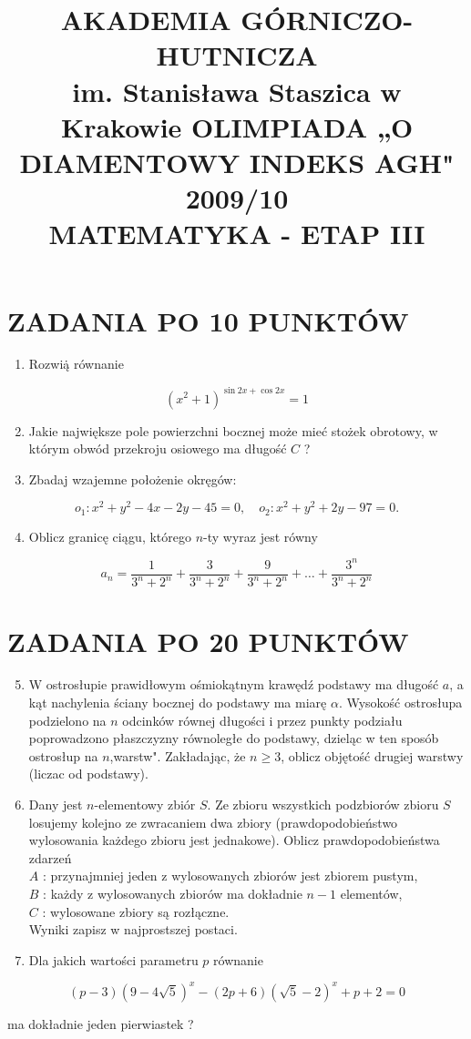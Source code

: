 \documentclass[10pt]{article}
\title{AKADEMIA GÓRNICZO-HUTNICZA \\
 im. Stanisława Staszica w Krakowie OLIMPIADA „O DIAMENTOWY INDEKS AGH" 2009/10 \\
 MATEMATYKA - ETAP III }
\author{}
\date{}
\begin{document}
\maketitle
\section*{ZADANIA PO 10 PUNKTÓW}
\begin{enumerate}
  \item Rozwią̇ równanie
\end{enumerate}

$$
\left(x^{2}+1\right)^{\sin 2 x+\cos 2 x}=1
$$

\begin{enumerate}
  \setcounter{enumi}{1}
  \item Jakie największe pole powierzchni bocznej może mieć stożek obrotowy, w którym obwód przekroju osiowego ma długość $C$ ?
  \item Zbadaj wzajemne położenie okręgów:
\end{enumerate}

$$
o_{1}: x^{2}+y^{2}-4 x-2 y-45=0, \quad o_{2}: x^{2}+y^{2}+2 y-97=0 .
$$

\begin{enumerate}
  \setcounter{enumi}{3}
  \item Oblicz granicę ciągu, którego $n$-ty wyraz jest równy
\end{enumerate}

$$
a_{n}=\frac{1}{3^{n}+2^{n}}+\frac{3}{3^{n}+2^{n}}+\frac{9}{3^{n}+2^{n}}+\ldots+\frac{3^{n}}{3^{n}+2^{n}}
$$

\section*{ZADANIA PO 20 PUNKTÓW}
\begin{enumerate}
  \setcounter{enumi}{4}
  \item W ostrosłupie prawidłowym ośmiokątnym krawędź podstawy ma długość $a$, a kąt nachylenia ściany bocznej do podstawy ma miarę $\alpha$. Wysokość ostrosłupa podzielono na $n$ odcinków równej długości i przez punkty podziału poprowadzono płaszczyzny równoległe do podstawy, dzieląc w ten sposób ostrosłup na $n$,warstw". Zakładając, że $n \geq 3$, oblicz objętość drugiej warstwy (liczac od podstawy).
  \item Dany jest $n$-elementowy zbiór $S$. Ze zbioru wszystkich podzbiorów zbioru $S$ losujemy kolejno ze zwracaniem dwa zbiory (prawdopodobieństwo wylosowania każdego zbioru jest jednakowe). Oblicz prawdopodobieństwa zdarzeń\\
$A$ : przynajmniej jeden z wylosowanych zbiorów jest zbiorem pustym,\\
$B$ : każdy z wylosowanych zbiorów ma dokładnie $n-1$ elementów,\\
$C$ : wylosowane zbiory są rozłączne.\\
Wyniki zapisz w najprostszej postaci.
  \item Dla jakich wartości parametru $p$ równanie
\end{enumerate}

$$
(p-3)(9-4 \sqrt{5})^{x}-(2 p+6)(\sqrt{5}-2)^{x}+p+2=0
$$

ma dokładnie jeden pierwiastek ?
\end{document}
